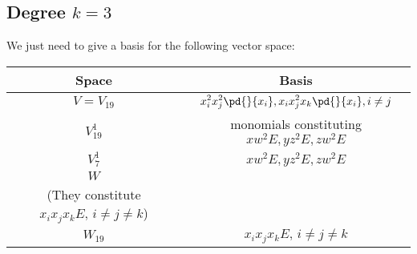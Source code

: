 %
\subsection{Degree \texorpdfstring{$k=3$}{k=3}}\label{app-C-3}
We just need to give a basis for the following vector space:
\begin{center}
\begin{longtable}{ c |  c }
Space &Basis \\
\hline
$V=V_{19}$ & $\displaystyle x_i^2x_j^2\pd{}{x_i}, x_ix_j^2x_k\pd{}{x_i}, i \not=j$ \\
$V_{19}^1$ & monomials constituting $xw^2E, yz^2 E, zw^2 E$\\
$V_7^1$ & $xw^2E, yz^2 E, zw^2 E$\\[5pt]
$W$ & 
\makecell{
$\displaystyle x_i^2x_jx_j\pd{}{x_i},xyzw\pd{}x_i,\, i\not=j\not=k,$ 
\\
 (They constitute $x_ix_jx_kE, \, i\not=j\not=k$)
}
\\
$W_{19}$ & $x_ix_jx_kE, \, i\not=j\not=k$ 
\end{longtable}
\end{center}

